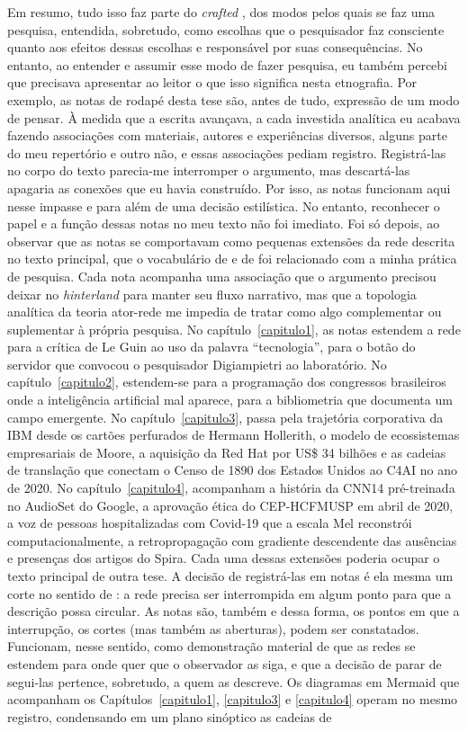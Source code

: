 Em resumo, tudo isso faz parte do \textit{crafted} \parencite{Law2004After}, dos modos pelos quais se faz uma pesquisa, entendida, sobretudo, como escolhas que o pesquisador faz consciente quanto aos efeitos dessas escolhas e responsável por suas consequências. No entanto, ao entender e assumir esse modo de fazer pesquisa, eu também percebi que precisava apresentar ao leitor o que isso significa nesta etnografia. Por exemplo, as notas de rodapé desta tese são, antes de tudo, expressão de um modo de pensar. À medida que a escrita avançava, a cada investida analítica eu acabava fazendo associações com materiais, autores e experiências diversos, alguns parte do meu repertório e outro não, e essas associações pediam registro. Registrá-las no corpo do texto parecia-me interromper o argumento, mas descartá-las apagaria as conexões que eu havia construído. Por isso, as notas funcionam aqui nesse impasse e para além de uma decisão estilística. No entanto, reconhecer o papel e a função dessas notas no meu texto não foi imediato. Foi só depois, ao observar que as notas se comportavam como pequenas extensões da rede descrita no texto principal, que o vocabulário de \textcite{strathern2011cortando} e de \textcite{Law2004After} foi relacionado com a minha prática de pesquisa. Cada nota acompanha uma associação que o argumento precisou deixar no \textit{hinterland} para manter seu fluxo narrativo, mas que a topologia analítica da teoria ator-rede me impedia de tratar como algo complementar ou suplementar à própria pesquisa. No capítulo~\ref{capitulo1}, as notas estendem a rede para a crítica de Le Guin ao uso da palavra ``tecnologia'', para o botão do servidor que convocou o pesquisador Digiampietri ao laboratório. No capítulo~\ref{capitulo2}, estendem-se para a programação dos congressos brasileiros onde a inteligência artificial mal aparece, para a bibliometria que documenta um campo emergente. No capítulo~\ref{capitulo3}, passa pela trajetória corporativa da IBM desde os cartões perfurados de Hermann Hollerith, o modelo de ecossistemas empresariais de Moore, a aquisição da Red Hat por US\$ 34 bilhões e as cadeias de translação que conectam o Censo de 1890 dos Estados Unidos ao C4AI no ano de 2020. No capítulo~\ref{capitulo4}, acompanham a história da CNN14 pré-treinada no AudioSet do Google, a aprovação ética do CEP-HCFMUSP em abril de 2020, a voz de pessoas hospitalizadas com Covid-19 que a escala Mel reconstrói computacionalmente, a retropropagação com gradiente descendente das ausências e presenças dos artigos do Spira. Cada uma dessas extensões poderia ocupar o texto principal de outra tese. A decisão de registrá-las em notas é ela mesma um corte no sentido de \textcite{strathern2011cortando}: a rede precisa ser interrompida em algum ponto para que a descrição possa circular. As notas são, também e dessa forma, os pontos em que a interrupção, os cortes (mas também as aberturas), podem ser constatados. Funcionam, nesse sentido, como demonstração material de que as redes se estendem para onde quer que o observador as siga, e que a decisão de parar de segui-las pertence, sobretudo, a quem as descreve. Os diagramas em Mermaid que acompanham os Capítulos~\ref{capitulo1}, \ref{capitulo3} e \ref{capitulo4} operam no mesmo registro, condensando em um plano sinóptico as cadeias de 